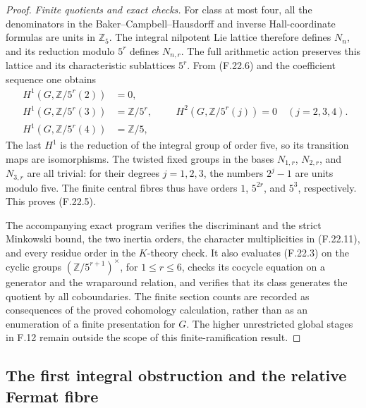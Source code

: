 \begin{proof}
\emph{Finite quotients and exact checks.}
For class at most four, all the denominators in the
Baker--Campbell--Hausdorff and inverse Hall-coordinate
formulas are units in \(\mathbb Z_5\). The integral
nilpotent Lie lattice therefore defines \(N_n\), and
its reduction modulo \(5^r\) defines \(N_{n,r}\).
The full arithmetic action preserves this lattice
and its characteristic sublattices \(5^r\).
From (F.22.6) and the coefficient sequence one obtains
\[
 \begin{split}
 H^1(G,\mathbb Z/5^r(2))&=0,\\
 H^1(G,\mathbb Z/5^r(3))&=\mathbb Z/5^r,\\
 H^1(G,\mathbb Z/5^r(4))&=\mathbb Z/5,
 \end{split}\qquad
 H^2(G,\mathbb Z/5^r(j))=0\quad(j=2,3,4).
                                                               \tag{F.22.17}
\]
The last \(H^1\) is the reduction of the integral group
of order five, so its transition maps are isomorphisms.
The twisted fixed groups in the bases \(N_{1,r}\),
\(N_{2,r}\), and \(N_{3,r}\) are all trivial: for their
degrees \(j=1,2,3\), the numbers \(2^j-1\) are units
modulo five. The finite central fibres thus have
orders \(1\), \(5^{2r}\), and \(5^3\), respectively.
This proves (F.22.5).

The accompanying exact program verifies the discriminant
and the strict Minkowski bound, the two inertia orders,
the character multiplicities in (F.22.11), and every
residue order in the \(K\)-theory check. It also evaluates
(F.22.3) on the cyclic groups
\((\mathbb Z/5^{r+1})^\times\), for \(1\leq r\leq6\),
checks its cocycle equation on a generator and the
wraparound relation, and verifies that its class
generates the quotient by all coboundaries.
The finite section counts are recorded as consequences
of the proved cohomology calculation, rather than as
an enumeration of a finite presentation for \(G\).
The higher unrestricted global stages in F.12 remain
outside the scope of this finite-ramification result.
\end{proof}

\subsection{The first integral obstruction and the relative Fermat fibre}

